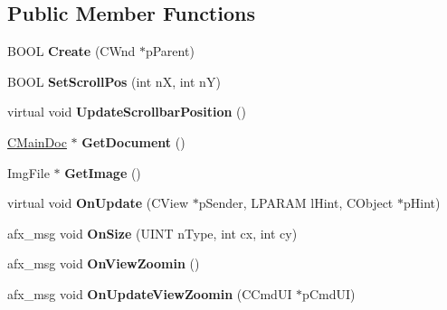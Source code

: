 \subsection*{Public Member Functions}
\begin{DoxyCompactItemize}
\item 
\mbox{\label{class_work_view_a52d32e6dc47500c5146d54f4ba424fa2}} 
B\+O\+OL {\bfseries Create} (C\+Wnd $\ast$p\+Parent)
\item 
\mbox{\label{class_work_view_ac30e92784349602e62a91164d6527be9}} 
B\+O\+OL {\bfseries Set\+Scroll\+Pos} (int nX, int nY)
\item 
\mbox{\label{class_work_view_a8926eb6da1d3b26cab931bb77cc89bbc}} 
virtual void {\bfseries Update\+Scrollbar\+Position} ()
\item 
\mbox{\label{class_work_view_a0a258afb445a0c3233e898811c9b5723}} 
\mbox{\hyperlink{class_c_main_doc}{C\+Main\+Doc}} $\ast$ {\bfseries Get\+Document} ()
\item 
\mbox{\label{class_work_view_aac149cb4e97f4067e350ff2df2f2e0bc}} 
Img\+File $\ast$ {\bfseries Get\+Image} ()
\item 
\mbox{\label{class_work_view_ac396e13c1bf765c6add07386c3fc02c4}} 
virtual void {\bfseries On\+Update} (C\+View $\ast$p\+Sender, L\+P\+A\+R\+AM l\+Hint, C\+Object $\ast$p\+Hint)
\item 
\mbox{\label{class_work_view_ae5fa678c052b3d9ac2dd6bc58d3210c8}} 
afx\+\_\+msg void {\bfseries On\+Size} (U\+I\+NT n\+Type, int cx, int cy)
\item 
\mbox{\label{class_work_view_ae85f3de8ad0f27895e47f130630cea85}} 
afx\+\_\+msg void {\bfseries On\+View\+Zoomin} ()
\item 
\mbox{\label{class_work_view_ac2f07c79088ef99c6d5a90a377a8db6b}} 
afx\+\_\+msg void {\bfseries On\+Update\+View\+Zoomin} (C\+Cmd\+UI $\ast$p\+Cmd\+UI)
\item 
\mbox{\label{class_work_view_a158434a846836afca5ba607102303951}} 

\end{DoxyCompactItemize}
